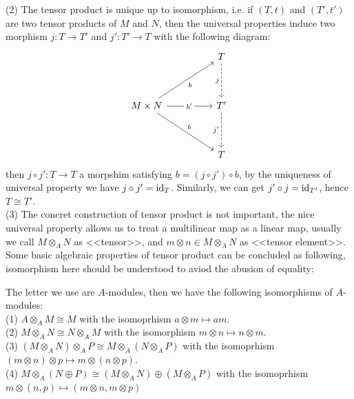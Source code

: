 \documentclass[12pt,a4paper]{article}
\begin{document}
    (2) The tensor product is unique up to isomorphism, i.e. if \((T,t)\) and \((T',t')\) are two tensor products of \(M\) and \(N\), then the universal properties induce two morphism \(j:T \to T'\) and \(j': T' \to T\) with the following diagram:
\[\begin{tikzcd}
	&& T \\
	\\
	{M\times N} && {T'} \\
	\\
	&& T
	\arrow["j"', dashed, from=1-3, to=3-3]
	\arrow["b"', from=3-1, to=1-3]
	\arrow["{b'}"{description}, from=3-1, to=3-3]
	\arrow["b", from=3-1, to=5-3]
	\arrow["{j'}"', dashed, from=3-3, to=5-3]
\end{tikzcd}\]
    then \(j\circ j':T \to T\) a morpshim satisfying \(b = (j \circ j') \circ b\), by the uniqueness of universal property we have \(j \circ j' = \operatorname{id}_T\). Similarly, we can get \(j' \circ j = \operatorname{id}_{T'}\), hence \(T \cong T'\).\\

    (3) The concret construction of tensor product is not important, the nice universal property allows us to treat a multilinear map as a linear map, usually we call \(M \otimes_A N\) as <<tensor>>, and \(m \otimes n \in M\otimes_A N\) as <<tensor element>>.\\

Some basic algebraic properties of tensor product can be concluded as following, isomorphism here should be understood to aviod the abusion of equality:
\begin{lemmaplain}
    The letter we use are \(A\)-modules, then we have the following isomorphisms of \(A\)-modules:\\

    (1) \(A \otimes_A M \cong M\) with the isomoprhism \(a \otimes m \mapsto am\).\\

    (2) \(M \otimes_A N \cong N \otimes_A M\) with the isomorphism \(m \otimes n \mapsto n \otimes m\).\\

    (3) \((M \otimes_A N) \otimes_A P \cong M \otimes_A (N \otimes_A P)\) with the isomoprhism \((m \otimes n) \otimes p \mapsto m \otimes (n \otimes p)\).\\

    (4) \(M \otimes_A (N \oplus P) \cong (M \otimes_A N) \oplus (M \otimes_A P)\) with the isomoprhism \(m \otimes (n,p) \mapsto (m\otimes n, m\otimes p)\) \\
\end{lemmaplain}
\end{document}
